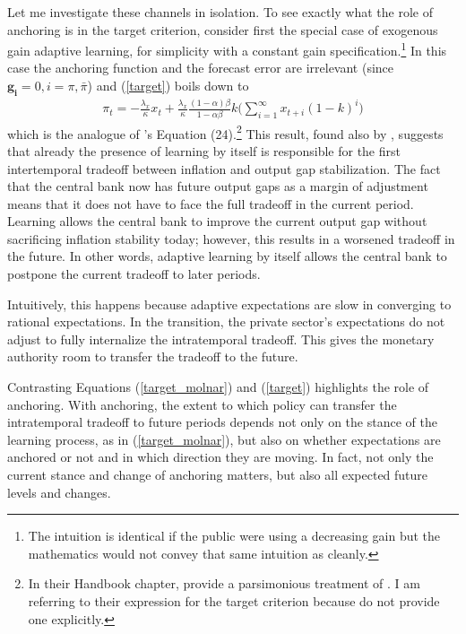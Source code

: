 \documentclass[11pt]{article}
\renewcommand{\[}{\begin{equation}}
\renewcommand{\]}{\end{equation}}
\begin{document}
Let me investigate these channels in isolation. To see exactly what the role of anchoring is in the target criterion, consider first the special case of exogenous gain adaptive learning, for simplicity with a constant gain specification.\footnote{The intuition is identical if the public were using a decreasing gain but the mathematics would not convey that same intuition as cleanly.} In this case the anchoring function and the forecast error are irrelevant (since $\mathbf{g_i}=0, i=\pi,\bar{\pi}$) and (\ref{target}) boils down to
\begin{align}
\pi_t  = -\frac{\lambda_x}{\kappa}x_t + \frac{\lambda_x}{\kappa} \frac{(1-\alpha)\beta}{1-\alpha\beta} k
\bigg(\sum_{i=1}^{\infty}x_{t+i}(1-k)^i \bigg)
\label{target_molnar} %
\end{align}
which is the analogue of \cite{gaspar2010inflation}'s Equation (24).\footnote{In their Handbook chapter, \cite{gaspar2010inflation} provide a parsimonious treatment of \cite{molnar2014optimal}. I am referring to their expression for the target criterion because \cite{molnar2014optimal} do not provide one explicitly.} This result, found also by \cite{molnar2014optimal}, suggests that already the presence of learning by itself is responsible for the first intertemporal tradeoff between inflation and output gap stabilization. The fact that the central bank now has future output gaps as a margin of adjustment means that it does not have to face the full tradeoff in the current period. Learning allows the central bank to improve the current output gap without sacrificing inflation stability today; however, this results in a worsened tradeoff in the future. In other words, adaptive learning by itself allows the central bank to postpone the current tradeoff to later periods. 

Intuitively, this happens because adaptive expectations are slow in converging to rational expectations. In the transition, the private sector's expectations do not adjust to fully internalize the intratemporal tradeoff. This gives the monetary authority room to transfer the tradeoff to the future.

Contrasting Equations (\ref{target_molnar}) and (\ref{target}) highlights the role of anchoring. With anchoring, the extent to which policy can transfer the intratemporal tradeoff to future periods depends not only on the stance of the learning process, as in (\ref{target_molnar}), but also on whether expectations are anchored or not and in which direction they are moving. In fact, not only the current stance and change of anchoring matters, but also all expected future levels and changes. 
\end{document}

